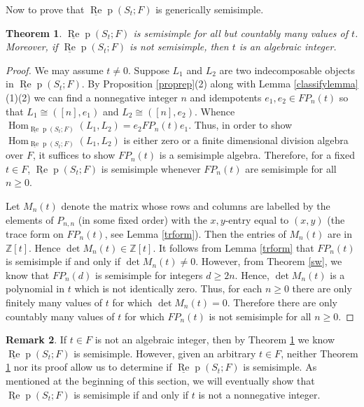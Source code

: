 \documentclass{amsart}
\newtheorem{theorem}{Theorem}[section]
\theoremstyle{definition}
\newtheorem{remark}[theorem]{Remark}
\newcommand{\Hom}{\operatorname{Hom}}
\def\uRep{\underline{\operatorname{Re}}\!\operatorname{p}}
\renewcommand{\1}{_{(1)}}
\renewcommand{\2}{_{(2)}}
\newcommand{\3}{_{(3)}}
\newcommand{\4}{_{(4)}}
\newcommand{\Z}{\mathbb{Z}}
\begin{document}
Now to prove that $\uRep(S_t; F)$ is generically semisimple.

\begin{theorem}\label{generic} $ \uRep(S_t; F)$ is semisimple for all but countably many values of $t$.  Moreover, if $ \uRep(S_t; F)$ is not semisimple, then $t$ is an algebraic integer.
\end{theorem}

\begin{proof}  We may assume $t\not=0$.  Suppose $L_1$ and $L_2$ are two indecomposable objects in $\uRep(S_t; F)$.  By Proposition \ref{proprep}(2) along with Lemma \ref{classifylemma}(1)(2) we can find a nonnegative integer $n$ and idempotents $e_1, e_2\in FP_n(t)$ so that $L_1\cong([n], e_1)$ and $L_2\cong([n], e_2)$.  Whence $\Hom_{ \uRep(S_t; F)}(L_1, L_2)=e_2FP_n(t)e_1$.  Thus, in order to show $\Hom_{ \uRep(S_t; F)}(L_1, L_2)$ is either zero or a finite dimensional division algebra over $F$, it suffices to show $FP_n(t)$ is a semisimple algebra.  Therefore, for a fixed $t\in F$, $ \uRep(S_t; F)$ is semisimple whenever $FP_n(t)$ are semisimple for all $n\geq 0$.  

Let $M_n(t)$ denote the matrix whose rows and columns are labelled by the elements of $P_{n,n}$ (in some fixed order) with the $x,y$-entry equal to $(x, y)$ (the trace form on $FP_n(t)$, see Lemma \ref{trform}).  Then the entries of $M_n(t)$ are in $\Z[t]$.  Hence $\det M_n(t)\in\Z[t]$.  It follows from Lemma \ref{trform} that $FP_n(t)$ is semisimple if and only if $\det M_n(t)\not=0$.  However, from Theorem \ref{sw}, we know that $FP_n(d)$ is semisimple for integers $d\geq 2n$.  Hence, $\det M_n(t)$ is a polynomial in $t$ which is not identically zero.
Thus, for each $n\geq0$ there are only finitely many values of $t$ for which $\det M_n(t)=0$.  Therefore there are only countably many values of $t$ for which $FP_n(t)$ is not semisimple for all $n\geq 0$.   
\end{proof}
       


\begin{remark} If $t\in F$ is not an algebraic integer, then by Theorem \ref{generic} we know $ \uRep(S_t; F)$ is semisimple.  However, given an arbitrary $t\in F$, 
neither Theorem \ref{generic} nor its proof allow us to determine if $\uRep(S_t; F)$ is semisimple.   As mentioned at the beginning of this section, we will eventually show that $\uRep(S_t; F)$ is semisimple if and only if $t$ is not a nonnegative integer.
\end{remark}
\end{document}

